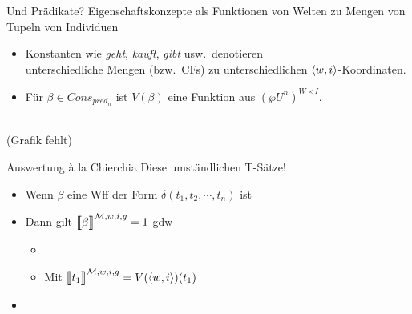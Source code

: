 \begin{frame}
  {Und Prädikate?}
  \onslide<+->
  \onslide<+->
  Eigenschaftskonzepte als Funktionen von Welten zu Mengen von Tupeln von Individuen\\
  \Halbzeile
  \begin{itemize}[<+->]
    \item Konstanten wie \textit{geht}, \textit{kauft}, \textit{gibt} usw.\ denotieren\\
      unterschiedliche Mengen (bzw.\ CFs) zu unterschiedlichen ${\langle{}w,i\rangle}$-Koordinaten.
    \item Für \alert{$\beta\in Cons_{pred_n}$} ist \alert{$V(\beta)$} eine Funktion aus \alert{$(\wp U^n)^{W\times I}$}.\\
      \\
  \end{itemize}
  \Halbzeile
  \onslide<+->
  \centering 
  (Grafik fehlt)
\end{frame}

\begin{frame}
  {Auswertung à la Chierchia}
  \onslide<+->
  \onslide<+->
  Diese umständlichen T-Sätze!\\
  \Halbzeile
  \begin{itemize}[<+->]
    \item Wenn \alert{$\beta$} eine Wff der Form \alert{$\delta(t_1,t_2,\cdots,t_n)$} ist
    \Viertelzeile
    \item Dann gilt \alert{$\DEMM{\beta}=1$} gdw
      \begin{itemize}[<+->]
        \item {}
        \item Mit $\DEMM{t_1}=V(\ram{w,i})(t_1)$
      \end{itemize}
      \Halbzeile
    \item[ ] 
  \end{itemize}
\end{frame}

